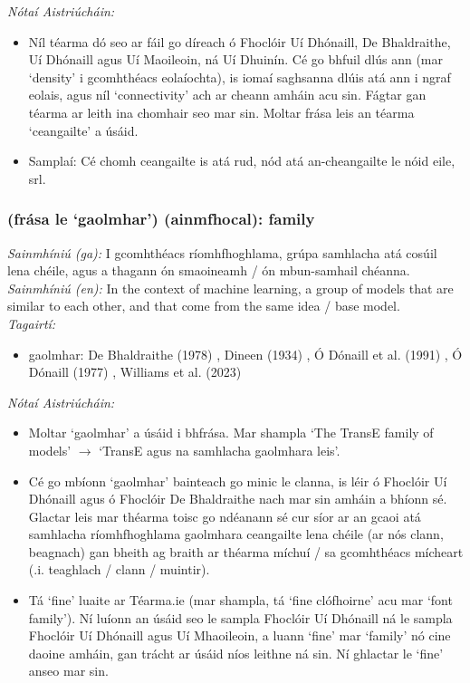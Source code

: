  \noindent \textit{Nótaí Aistriúcháin:}
\begin{itemize}
	\item Níl téarma dó seo ar fáil go díreach ó Fhoclóir Uí Dhónaill, De Bhaldraithe, Uí Dhónaill agus Uí Maoileoin, ná Uí Dhuinín. Cé go bhfuil dlús ann (mar `density' i gcomhthéacs eolaíochta), is iomaí saghsanna dlúis atá ann i ngraf eolais, agus níl `connectivity' ach ar cheann amháin acu sin. Fágtar gan téarma ar leith ina chomhair seo mar sin. Moltar frása leis an téarma `ceangailte' a úsáid.
	\item Samplaí: Cé chomh ceangailte is atá rud, nód atá an-cheangailte le nóid eile, srl.
\end{itemize}


\subsubsection*{(frása le `gaolmhar') (ainmfhocal): family}
 \noindent \textit{Sainmhíniú (ga):} I gcomhthéacs ríomhfhoghlama, grúpa samhlacha atá cosúil lena chéile, agus a thagann ón smaoineamh / ón mbun-samhail chéanna.
\\
 \noindent \textit{Sainmhíniú (en):} In the context of machine learning, a group of models that are similar to each other, and that come from the same idea / base model.
\\
 \noindent \textit{Tagairtí:}
\begin{itemize}
	\item gaolmhar: De Bhaldraithe (1978) \cite{de-bhaldraithe}, Dineen (1934) \cite{dineen}, Ó Dónaill et al. (1991) \cite{focloir-beag}, Ó Dónaill (1977) \cite{odonaill}, Williams et al. (2023) \cite{storchiste}
\end{itemize}

 \noindent \textit{Nótaí Aistriúcháin:}
\begin{itemize}
	\item Moltar `gaolmhar' a úsáid i bhfrása. Mar shampla `The TransE family of models' $\rightarrow$ `TransE agus na samhlacha gaolmhara leis'.
	\item Cé go mbíonn `gaolmhar' bainteach go minic le clanna, is léir ó Fhoclóir Uí Dhónaill agus ó Fhoclóir De Bhaldraithe nach mar sin amháin a bhíonn sé. Glactar leis mar théarma toisc go ndéanann sé cur síor ar an gcaoi atá samhlacha ríomhfhoghlama gaolmhara ceangailte lena chéile (ar nós clann, beagnach) gan bheith ag braith ar théarma míchuí / sa gcomhthéacs mícheart (.i. teaghlach / clann / muintir).
	\item Tá `fine' luaite ar Téarma.ie (mar shampla, tá `fine clófhoirne' acu mar `font family'). Ní luíonn an úsáid seo le sampla Fhoclóir Uí Dhónaill ná le sampla Fhoclóir Uí Dhónaill agus Uí Mhaoileoin, a luann `fine' mar `family' nó cine daoine amháin, gan trácht ar úsáid níos leithne ná sin. Ní ghlactar le `fine' anseo mar sin.
\end{itemize}


